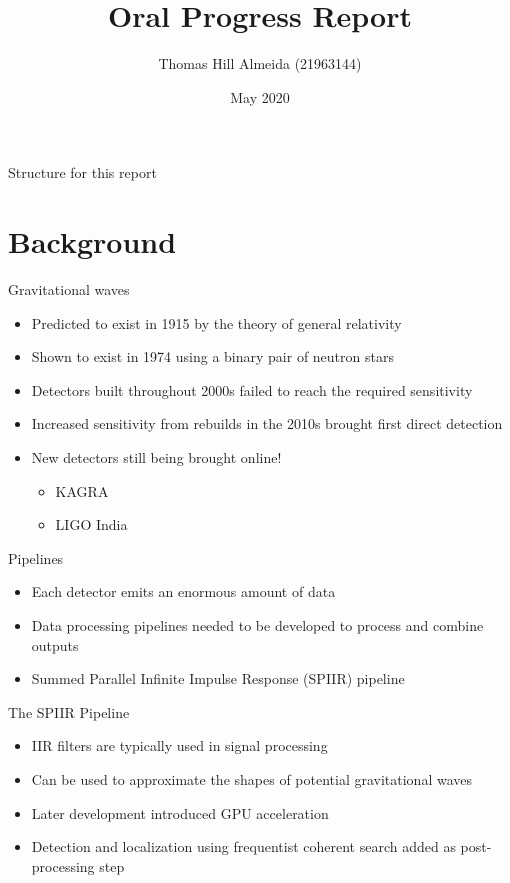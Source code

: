 \documentclass{beamer}
\title{Oral Progress Report}
\author{Thomas Hill Almeida (21963144)}
\institute{UWA --- OzGrav}
\date{May 2020}
\begin{document}
\begin{frame}
    \maketitle
\end{frame}

\begin{frame}{Structure for this report}
    \tableofcontents{}
\end{frame}

\section{Background}
\begin{frame}{Gravitational waves}
    \begin{itemize}
        \item Predicted to exist in 1915 by the theory of general relativity
        \pause{} \item Shown to exist in 1974 using a binary pair of neutron
            stars
        \pause{} \item Detectors built throughout 2000s failed to reach the
            required sensitivity
        \pause{} \item Increased sensitivity from rebuilds in the 2010s brought
            first direct detection
        \item New detectors still being brought online!
            \begin{itemize}
                \item KAGRA
                \item LIGO India
            \end{itemize}
    \end{itemize}
\end{frame}
\begin{frame}{Pipelines}
    \begin{itemize}
        \item Each detector emits an enormous amount of data
        \pause{} \item Data processing pipelines needed to be developed to
            process and combine outputs
        \pause{} \item Summed Parallel Infinite Impulse Response (SPIIR)
            pipeline
    \end{itemize}
\end{frame}
\begin{frame}{The SPIIR Pipeline}
    \begin{itemize}
        \item IIR filters are typically used in signal processing
        \item Can be used to approximate the shapes of potential gravitational
            waves
        \pause{} \item Later development introduced GPU acceleration
        \item Detection and localization using frequentist coherent search
            added as post-processing step
    \end{itemize}
\end{frame}
\end{document}

